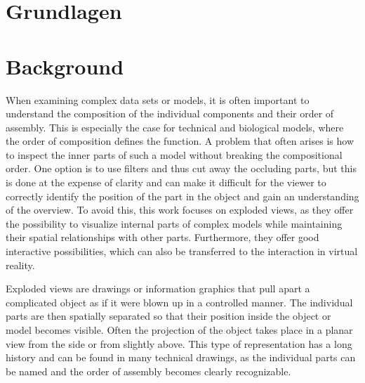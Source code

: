 {\chapter{Grundlagen}}
{\chapter{Background}}
\label{sec:background}





When examining complex data sets or models, it is often important to understand the composition of the individual components and their order of assembly. 
This is especially the case for technical and biological models, where the order of composition defines the function. 
A problem that often arises is how to inspect the inner parts of such a model without breaking the compositional order. 
One option is to use filters and thus cut away the occluding parts, but this is done at the expense of clarity and can make it difficult for the viewer to correctly identify the position of the part in the object and gain an understanding of the overview. 
To avoid this, this work focuses on exploded views, as they offer the possibility to visualize internal parts of complex models while maintaining their spatial relationships with other parts.
Furthermore, they offer good interactive possibilities, which can also be transferred to the interaction in virtual reality.

Exploded views are drawings or information graphics that pull apart a complicated object as if it were blown up in a controlled manner. 
The individual parts are then spatially separated so that their position inside the object or model becomes visible. 
Often the projection of the object takes place in a planar view from the side or from slightly above.
This type of representation has a long history and can be found in many technical drawings, as the individual parts can be named and the order of assembly becomes clearly recognizable. %

